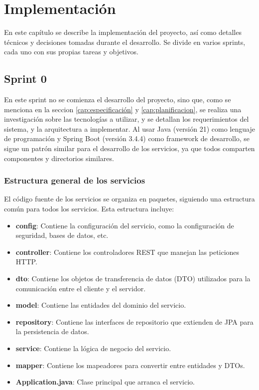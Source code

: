 \chapter{Implementación}\label{cap:implementacion}

En este capítulo se describe la implementación del proyecto, así como detalles técnicos y decisiones tomadas durante el desarrollo. Se divide en varios sprints, cada uno con sus propias tareas y objetivos.

\section{Sprint 0}

En este sprint no se comienza el desarrollo del proyecto, sino que, como se menciona en la seccion \ref{cap:especificación} y \ref{cap:planificacion}, se realiza una investigación sobre las tecnologías a utilizar, y se detallan los requerimientos del sistema, y la arquitectura a implementar.
\newline\newline
Al usar Java (versión 21) como lenguaje de programación y Spring Boot (versión 3.4.4) como framework de desarrollo, se sigue un patrón similar para el desarrollo de los servicios, ya que todos comparten componentes y directorios similares.

\subsection{Estructura general de los servicios}

El código fuente de los servicios se organiza en paquetes, siguiendo una estructura común para todos los servicios. Esta estructura incluye:

\begin{itemize}
    \item \textbf{config}: Contiene la configuración del servicio, como la configuración de seguridad, bases de datos, etc.
    \item \textbf{controller}: Contiene los controladores REST que manejan las peticiones HTTP.
    \item \textbf{dto}: Contiene los objetos de transferencia de datos (DTO) utilizados para la comunicación entre el cliente y el servidor.
    \item \textbf{model}: Contiene las entidades del dominio del servicio.
    \item \textbf{repository}: Contiene las interfaces de repositorio que extienden de JPA para la persistencia de datos.
    \item \textbf{service}: Contiene la lógica de negocio del servicio.
    \item \textbf{mapper}: Contiene los mapeadores para convertir entre entidades y DTOs.
    \item \textbf{Application.java}: Clase principal que arranca el servicio.
\end{itemize}

